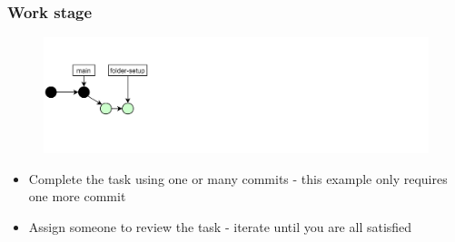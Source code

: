 \documentclass[aspectratio=169]{beamer} %
\begin{document}
\begin{frame}
	\frametitle{Work stage}
	
	\vspace{-.5cm}
	\begin{minipage}[t][5cm][t]{\textwidth}
		\begin{figure}
			\centering
			\includegraphics[width=\textwidth]{./img/dime-gitflow-network-1-2.png}
		\end{figure}
	\end{minipage}  
	
	\vspace{-.5cm}
	\begin{minipage}[t][5cm][t]{\textwidth}
		\begin{itemize}
			\setlength\itemsep{.5em}
			\item Complete the task using one or many commits - this example only requires one more commit
			\item Assign someone to review the task - iterate until you are all satisfied
		\end{itemize}
	\end{minipage}  
	
\end{frame}
\end{document}
